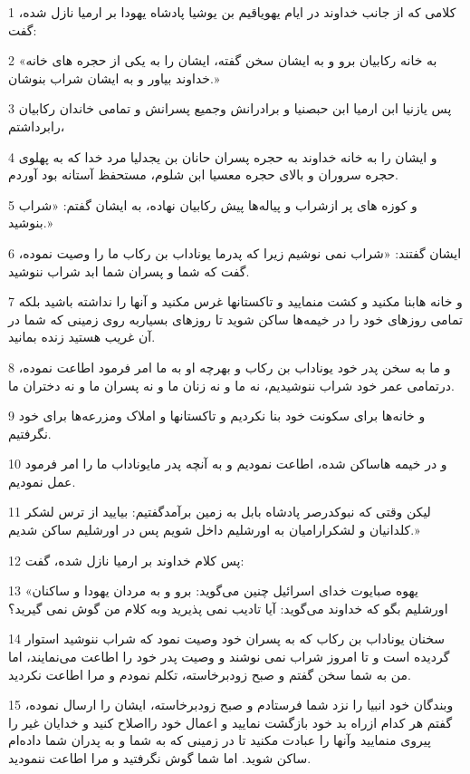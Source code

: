 \par 1 کلامی که از جانب خداوند در ایام یهویاقیم بن یوشیا پادشاه یهودا بر ارمیا نازل شده، گفت:
\par 2 «به خانه رکابیان برو و به ایشان سخن گفته، ایشان را به یکی از حجره های خانه خداوند بیاور و به ایشان شراب بنوشان.»
\par 3 پس یازنیا ابن ارمیا ابن حبصنیا و برادرانش وجمیع پسرانش و تمامی خاندان رکابیان رابرداشتم،
\par 4 و ایشان را به خانه خداوند به حجره پسران حانان بن یجدلیا مرد خدا که به پهلوی حجره سروران و بالای حجره معسیا ابن شلوم، مستحفظ آستانه بود آوردم.
\par 5 و کوزه های پر ازشراب و پیاله‌ها پیش رکابیان نهاده، به ایشان گفتم: «شراب بنوشید.»
\par 6 ایشان گفتند: «شراب نمی نوشیم زیرا که پدرما یوناداب بن رکاب ما را وصیت نموده، گفت که شما و پسران شما ابد شراب ننوشید.
\par 7 و خانه هابنا مکنید و کشت منمایید و تاکستانها غرس مکنید و آنها را نداشته باشید بلکه تمامی روزهای خود را در خیمه‌ها ساکن شوید تا روزهای بسیاربه روی زمینی که شما در آن غریب هستید زنده بمانید.
\par 8 و ما به سخن پدر خود یوناداب بن رکاب و بهر‌چه او به ما امر فرمود اطاعت نموده، درتمامی عمر خود شراب ننوشیدیم، نه ما و نه زنان ما و نه پسران ما و نه دختران ما.
\par 9 و خانه‌ها برای سکونت خود بنا نکردیم و تاکستانها و املاک ومزرعه‌ها برای خود نگرفتیم.
\par 10 و در خیمه هاساکن شده، اطاعت نمودیم و به آنچه پدر مایوناداب ما را امر فرمود عمل نمودیم.
\par 11 لیکن وقتی که نبوکدرصر پادشاه بابل به زمین برآمدگفتیم: بیایید از ترس لشکر کلدانیان و لشکرارامیان به اورشلیم داخل شویم پس در اورشلیم ساکن شدیم.»
\par 12 پس کلام خداوند بر ارمیا نازل شده، گفت:
\par 13 «یهوه صبایوت خدای اسرائیل چنین می‌گوید: برو و به مردان یهودا و ساکنان اورشلیم بگو که خداوند می‌گوید: آیا تادیب نمی پذیرید وبه کلام من گوش نمی گیرید؟
\par 14 سخنان یوناداب بن رکاب که به پسران خود وصیت نمود که شراب ننوشید استوار گردیده است و تا امروز شراب نمی نوشند و وصیت پدر خود را اطاعت می‌نمایند، اما من به شما سخن گفتم و صبح زودبرخاسته، تکلم نمودم و مرا اطاعت نکردید.
\par 15 وبندگان خود انبیا را نزد شما فرستادم و صبح زودبرخاسته، ایشان را ارسال نموده، گفتم هر کدام ازراه بد خود بازگشت نمایید و اعمال خود رااصلاح کنید و خدایان غیر را پیروی منمایید وآنها را عبادت مکنید تا در زمینی که به شما و به پدران شما داده‌ام ساکن شوید. اما شما گوش نگرفتید و مرا اطاعت ننمودید.
